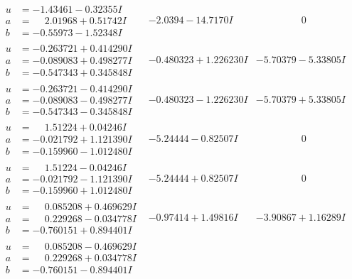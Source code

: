 \documentclass[1p]{elsarticle_modified}
\theoremstyle{definition}
\begin{document}
$$\begin{array}{c|c|c}
 \hline 
\begin{aligned}
u &= -1.43461 - 0.32355 I \\
a &= \phantom{-}2.01968 + 0.51742 I \\
b &= -0.55973 - 1.52348 I\end{aligned}
 & -2.0394 - 14.7170 I & \phantom{-0.000000 } 0 \\ \hline\begin{aligned}
u &= -0.263721 + 0.414290 I \\
a &= -0.089083 + 0.498277 I \\
b &= -0.547343 + 0.345848 I\end{aligned}
 & -0.480323 + 1.226230 I & -5.70379 - 5.33805 I \\ \hline\begin{aligned}
u &= -0.263721 - 0.414290 I \\
a &= -0.089083 - 0.498277 I \\
b &= -0.547343 - 0.345848 I\end{aligned}
 & -0.480323 - 1.226230 I & -5.70379 + 5.33805 I \\ \hline\begin{aligned}
u &= \phantom{-}1.51224 + 0.04246 I \\
a &= -0.021792 + 1.121390 I \\
b &= -0.159960 - 1.012480 I\end{aligned}
 & -5.24444 - 0.82507 I & \phantom{-0.000000 } 0 \\ \hline\begin{aligned}
u &= \phantom{-}1.51224 - 0.04246 I \\
a &= -0.021792 - 1.121390 I \\
b &= -0.159960 + 1.012480 I\end{aligned}
 & -5.24444 + 0.82507 I & \phantom{-0.000000 } 0 \\ \hline\begin{aligned}
u &= \phantom{-}0.085208 + 0.469629 I \\
a &= \phantom{-}0.229268 - 0.034778 I \\
b &= -0.760151 + 0.894401 I\end{aligned}
 & -0.97414 + 1.49816 I & -3.90867 + 1.16289 I \\ \hline\begin{aligned}
u &= \phantom{-}0.085208 - 0.469629 I \\
a &= \phantom{-}0.229268 + 0.034778 I \\
b &= -0.760151 - 0.894401 I\end{aligned}

\end{array}$$
\end{document}
